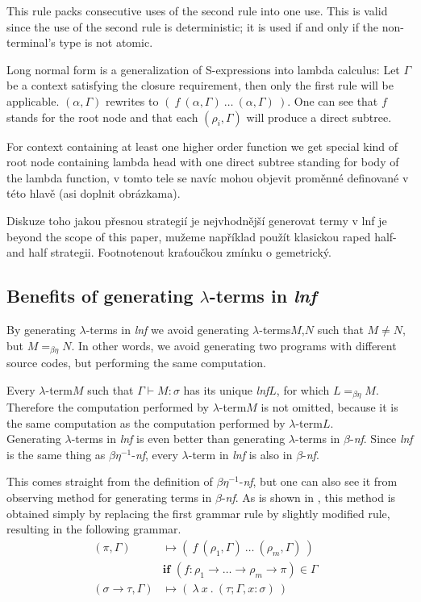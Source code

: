 \documentclass{sig-alternate}
\newcommand{\lterm}{$\lambda$-term\xspace}
\newcommand{\lterms}{$\lambda$-terms\xspace}
\newcommand{\turst}[3]{$#1\vdash{}#2:#3$\xspace}
\newcommand{\GMS}{\turst{\Gamma}{M}{\sigma}}
\newcommand{\bnf}{$\beta$-\textit{nf}\xspace}
\newcommand{\beenf}{$\beta\eta^{-1}$-\textit{nf}\xspace}
\newcommand{\lnf}{\textit{lnf}\xspace}
\newcommand{\ar}{\rightarrow\xspace}
\newcommand{\gar}{\longmapsto}
\newcommand{\red}[1]{{\color{red} #1}}
\begin{document}
This rule packs consecutive uses of the second rule into one use.
This is valid since the use of the second rule is deterministic;
it is used if and only if the non-terminal's type is not atomic.

Long normal form is a generalization of S-expressions into lambda calculus:
Let $\Gamma$ be a context satisfying the closure requirement, then only
the first rule will be applicable. 
$(\alpha, \Gamma)$ rewrites to $(~f~( \alpha, \Gamma )~\dots~( \alpha, \Gamma )~)$.
One can see that $f$ stands for 
the root node and that each $( \rho_i , \Gamma )$ will produce a direct subtree. 

\red{
For context containing at least one higher order function we get special kind of root node containing lambda head with one direct subtree standing for body of 
the lambda function, v tomto tele se navíc mohou objevit proměnné 
definované v této hlavě (asi doplnit obrázkama).

Diskuze toho jakou přesnou strategií je nejvhodnější generovat
termy v lnf je beyond the scope of this paper, mužeme například použít
klasickou raped half-and half strategii. Footnotenout kraťoučkou
zmínku o gemetrický. 
}


\subsection{Benefits of generating \lterms in \lnf}
\label{benefits}

By generating \lterms in \textit{lnf} we avoid generating 
\lterms $M$,$N$ such that $M \not= N$, but $M =_{\beta\eta} N$.
In other words, we avoid generating two programs with different 
source codes, but performing the same computation.

Every \lterm $M$ such that \GMS has its unique \lnf $L$, 
for which $L =_{\beta\eta} M$.
Therefore the computation performed by \lterm $M$ 
is not omitted, because it is the same computation
as the computation performed by \lterm $L$. \\

Generating \lterms in \lnf is even better than generating 
\lterms in \bnf. Since \lnf is the same thing as \beenf,
every \lterm in \lnf is also in \bnf. 

This comes straight from the definition of \beenf, 
but one can also see it from observing method for generating
terms in \bnf. As is shown in \cite{barendregt10}, 
this method is obtained simply by replacing  
the first grammar rule by slightly modified rule,
resulting in the following grammar.
\begin{align*}
( \pi , \Gamma )  
&\gar
(~f~( \rho_1 , \Gamma )~\dots~( \rho_m , \Gamma )~)
\\& \textbf{if } (f : \rho_1 \ar \dots \ar \rho_m \ar \pi) \in \Gamma
\\ 
( \sigma \rightarrow \tau , \Gamma )  
&\gar
(~\lambda~x~.~( \tau ; \Gamma,x:\sigma )~)
&   
\end{align*}
\end{document}
